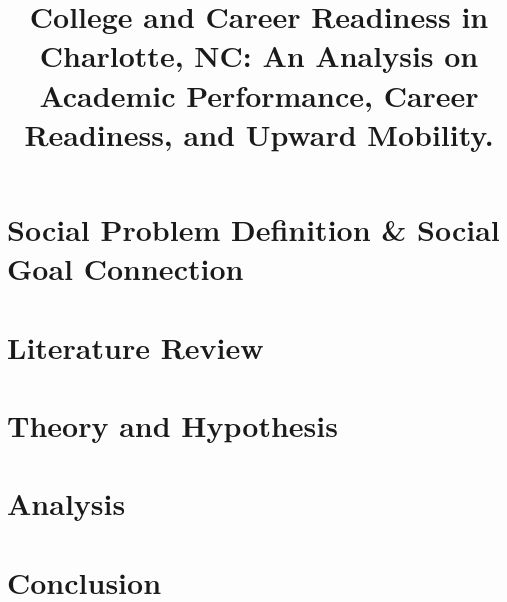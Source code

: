 \documentclass[stu, 12pt, a4paper, floatsintext, right=4cm]{apa7}
\title{College and Career Readiness in Charlotte, NC: An Analysis on Academic Performance, Career Readiness, and Upward Mobility.}
\begin{document}

\section{Social Problem Definition \& Social Goal Connection}

\section{Literature Review}

\section{Theory and Hypothesis}

\section{Analysis}

\section{Conclusion}



\end{document}
